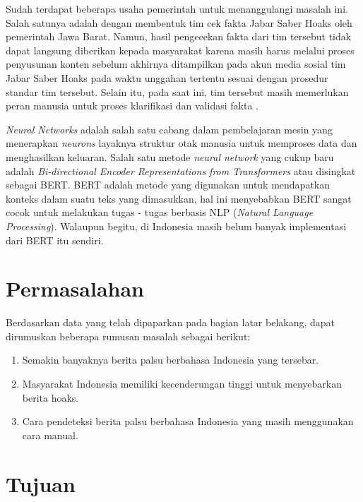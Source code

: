 Sudah terdapat beberapa usaha pemerintah untuk menanggulangi masalah ini. Salah satunya adalah dengan membentuk tim cek fakta Jabar Saber Hoaks oleh pemerintah Jawa Barat. Namun, hasil pengecekan fakta dari tim tersebut tidak dapat langsung diberikan kepada masyarakat karena masih harus melalui proses penyusunan konten sebelum akhirnya ditampilkan pada akun media sosial tim Jabar Saber Hoaks pada waktu unggahan tertentu sesuai dengan prosedur standar tim tersebut. Selain itu, pada saat ini, tim tersebut masih memerlukan peran manusia untuk proses klarifikasi dan validasi fakta \cite{cekfakta_analyze}.

\textit{Neural Networks} adalah salah satu cabang dalam pembelajaran mesin yang menerapkan \textit{neurons} layaknya struktur otak manusia untuk memproses data dan menghasilkan keluaran. Salah satu metode \textit{neural network} yang cukup baru adalah \textit{Bi-directional Encoder Representations from Transformers} atau disingkat sebagai BERT. BERT adalah metode yang digunakan untuk mendapatkan konteks dalam suatu teks yang dimasukkan, hal ini menyebabkan BERT sangat cocok untuk melakukan tugas - tugas berbasis NLP (\textit{Natural Language Processing}). Walaupun begitu, di Indonesia masih belum banyak implementasi dari BERT itu sendiri.

\section{Permasalahan}
\label{sec:permasalahan}

Berdasarkan data yang telah dipaparkan pada bagian latar belakang, dapat dirumuskan beberapa rumusan masalah sebagai berikut:

\begin{enumerate}[itemsep=-0.2em]
      \item Semakin banyaknya berita palsu berbahasa Indonesia yang tersebar.

      \item Masyarakat Indonesia memiliki kecenderungan tinggi untuk menyebarkan berita hoaks.

      \item Cara pendeteksi berita palsu berbahasa Indonesia yang masih menggunakan cara manual.

\end{enumerate}

\section{Tujuan}
\label{sec:Tujuan}

